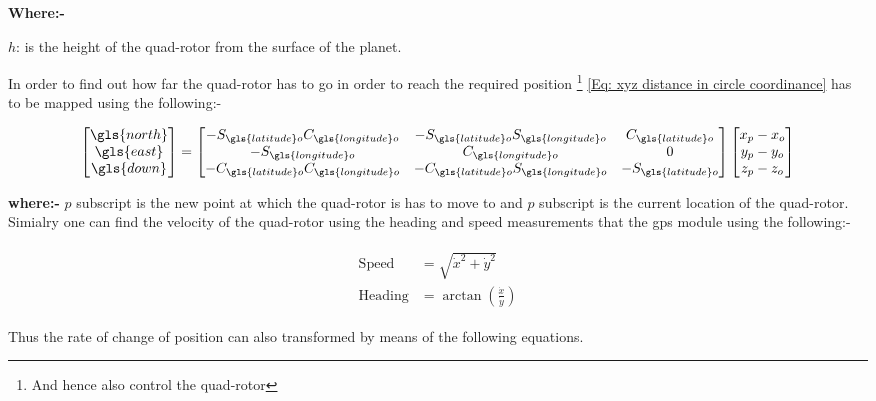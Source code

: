 {\bf Where:-}

$h$: is the height of the quad-rotor from the surface of the planet.

\newpage
 
 
 In order to find out how far the quad-rotor has to go in order to reach the required position \footnote{And hence also control the quad-rotor} \eqref{Eq: xyz distance in circle coordinance} has to be mapped using the following:-
 
 
 
 \begin{equation}
 \begin{bmatrix}																
 \gls{north}         			\\
 \gls{east} 	  \\
 \gls{down}
 \end{bmatrix}
 =
 \begin{bmatrix}																
 -S_{\gls{latitude}o}C_{\gls{longitude}o}	& -S_{\gls{latitude}o}S_{\gls{longitude}o}	 & C_{\gls{latitude}o}\\
 -S_{\gls{longitude}o}		& C_{\gls{longitude}o} & 0\\
 -C_{\gls{latitude}o}C_{\gls{longitude}o} 	& -C_{\gls{latitude}o}S_{\gls{longitude}o} & -S_{\gls{latitude}o}
 \end{bmatrix}
 \begin{bmatrix}																
   x_p - x_o    			\\
   y_p - y_o   	  \\
  z_p - z_o 
 \end{bmatrix} 
\label{Eq: ecef frame mapping}
 \end{equation}
 
 {\bf where:-} $p$ subscript is the new point at which the quad-rotor is has to move to and $p$ subscript is the current location of the quad-rotor. Simialry one can find the velocity of the quad-rotor using the heading and speed measurements that the \gls{gps} module using the following:-
 
 \begin{align}
\begin{split}
 \mathrm{Speed} &= \sqrt{\dot{x}^2 +\dot{y}^2 }\\
 \mathrm{Heading} &= \arctan\left(\frac{\dot{x}}{\dot{y}}\right)
\end{split}
 \end{align}

Thus the rate of change of position can also transformed by means of the following equations.

